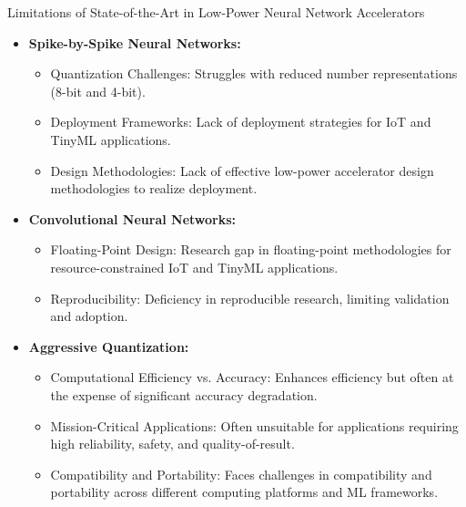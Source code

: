 	
	
\begin{frame}{Limitations of State-of-the-Art in Low-Power Neural Network Accelerators}
	\begin{itemize}
		\item<1-> \textbf{Spike-by-Spike Neural Networks:}
		\begin{itemize}
			\item<2-> \alert{Quantization Challenges:} Struggles with reduced number representations (8-bit and 4-bit).
			\item<3-> \alert{Deployment Frameworks:} Lack of deployment strategies for IoT and TinyML applications.
			\item<4-> \alert{Design Methodologies:} Lack of effective low-power accelerator design methodologies to realize deployment.
		\end{itemize}
		\item<5-> \textbf{Convolutional Neural Networks:}
		\begin{itemize}
			\item<6-> \alert{Floating-Point Design:} Research gap in floating-point methodologies for resource-constrained IoT and TinyML applications.
			\item<7-> \alert{Reproducibility:} Deficiency in reproducible research, limiting validation and adoption.
		\end{itemize}
		\item<8-> \textbf{Aggressive Quantization:}
		\begin{itemize}
			\item<9-> \alert{Computational Efficiency vs. Accuracy:} Enhances efficiency but often at the expense of significant accuracy degradation.
			\item<10-> \alert{Mission-Critical Applications:} Often unsuitable for applications requiring high reliability, safety, and quality-of-result.
			\item<11-> \alert{Compatibility and Portability:} Faces challenges in compatibility and portability across different computing platforms and ML frameworks.
		\end{itemize}
	\end{itemize}
\end{frame}